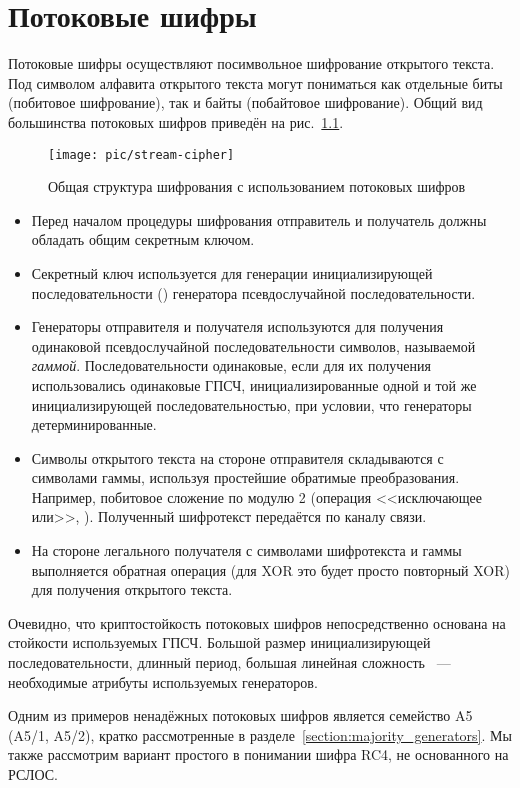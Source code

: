 \chapter{Потоковые шифры}\label{chapter-stream-ciphers}

Потоковые шифры осуществляют посимвольное шифрование открытого текста. Под символом алфавита открытого текста могут пониматься как отдельные биты (побитовое шифрование), так и байты (побайтовое шифрование). Общий вид большинства потоковых шифров приведён на рис.~\ref{fig:stream-cipher}.

\begin{figure}[hb]
	\centering
	\texttt{[image: pic/stream-cipher]}
  \caption{Общая структура шифрования с использованием потоковых шифров}
  \label{fig:stream-cipher}
\end{figure}

\begin{itemize}
	\item Перед началом процедуры шифрования отправитель и получатель должны обладать общим секретным ключом.
	\item Секретный ключ используется для генерации инициализирующей последовательности () генератора псевдослучайной последовательности.
	\item Генераторы отправителя и получателя используются для получения одинаковой псевдослучайной последовательности символов, называемой \emph{гаммой}. Последовательности одинаковые, если для их получения использовались одинаковые ГПСЧ, инициализированные одной и той же инициализирующей последовательностью, при условии, что генераторы детерминированные.
	\item Символы открытого текста на стороне отправителя складываются с символами гаммы, используя простейшие обратимые преобразования. Например, побитовое сложение по модулю 2 (операция <<исключающее или>>, ). Полученный шифротекст передаётся по каналу связи.
	\item На стороне легального получателя с символами шифротекста и гаммы выполняется обратная операция (для XOR это будет просто повторный XOR) для получения открытого текста.
\end{itemize}

Очевидно, что криптостойкость потоковых шифров непосредственно основана на стойкости используемых ГПСЧ. Большой размер инициализирующей последовательности, длинный период, большая линейная сложность ~--- необходимые атрибуты используемых генераторов.

Одним из примеров ненадёжных потоковых шифров является семейство A5 (A5/1, A5/2), кратко рассмотренные в разделе~\ref{section:majority_generators}. Мы также рассмотрим вариант простого в понимании шифра RC4, не основанного на РСЛОС.



